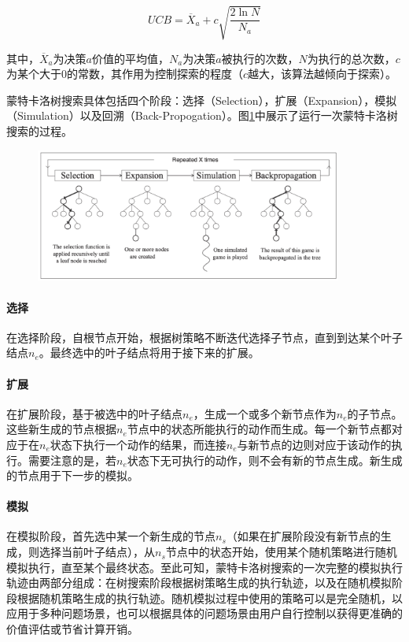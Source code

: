 \begin{equation}
UCB = \overline{X}_{a} + c\sqrt{\frac{2\ln N}{N_a}}
\end{equation}

其中，$\overline{X}_{a}$为决策$a$价值的平均值，$N_a$为决策$a$被执行的次数，$N$为执行的总次数，$c$为某个大于0的常数，其作用为控制探索的程度（$c$越大，该算法越倾向于探索）。

蒙特卡洛树搜索具体包括四个阶段：选择（Selection），扩展（Expansion），模拟（Simulation）以及回溯（Back-Propogation）。图\ref{fig:mcts_process}中展示了运行一次蒙特卡洛树搜索的过程。

\begin{figure}[htb]
\centering
\includegraphics[width=0.9\textwidth]{./figs/mcts_process}
\label{fig:mcts_process}
\end{figure}

\paragraph{选择}
在选择阶段，自根节点开始，根据树策略不断迭代选择子节点，直到到达某个叶子结点$n_e$。最终选中的叶子结点将用于接下来的扩展。
\paragraph{扩展}
在扩展阶段，基于被选中的叶子结点$n_e$，生成一个或多个新节点作为$n_e$的子节点。这些新生成的节点根据$n_e$节点中的状态所能执行的动作而生成。每一个新节点都对应于在$n_e$状态下执行一个动作的结果，而连接$n_e$与新节点的边则对应于该动作的执行。需要注意的是，若$n_e$状态下无可执行的动作，则不会有新的节点生成。新生成的节点用于下一步的模拟。
\paragraph{模拟}
在模拟阶段，首先选中某一个新生成的节点$n_s$（如果在扩展阶段没有新节点的生成，则选择当前叶子结点），从$n_s$节点中的状态开始，使用某个随机策略进行随机模拟执行，直至某个最终状态。至此可知，蒙特卡洛树搜索的一次完整的模拟执行轨迹由两部分组成：在树搜索阶段根据树策略生成的执行轨迹，以及在随机模拟阶段根据随机策略生成的执行轨迹。随机模拟过程中使用的策略可以是完全随机，以应用于多种问题场景，也可以根据具体的问题场景由用户自行控制以获得更准确的价值评估或节省计算开销。
